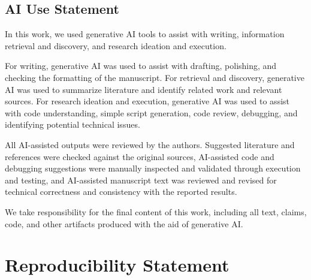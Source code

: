 \subsection*{AI Use Statement}

In this work, we used generative AI tools to assist with writing, information retrieval and discovery, and research ideation and execution.

For writing, generative AI was used to assist with drafting, polishing, and checking the formatting of the manuscript. For retrieval and discovery, generative AI was used to summarize literature and identify related work and relevant sources. For research ideation and execution, generative AI was used to assist with code understanding, simple script generation, code review, debugging, and identifying potential technical issues.

All AI-assisted outputs were reviewed by the authors. Suggested literature and references were checked against the original sources, AI-assisted code and debugging suggestions were manually inspected and validated through execution and testing, and AI-assisted manuscript text was reviewed and revised for technical correctness and consistency with the reported results.

We take responsibility for the final content of this work, including all text, claims, code, and other artifacts produced with the aid of generative AI.





\section*{Reproducibility Statement}

